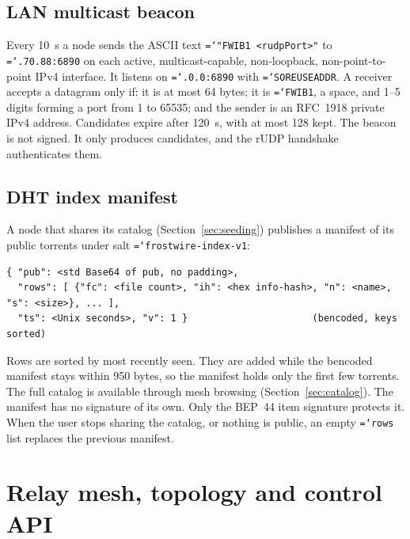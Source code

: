 \documentclass[11pt,a4paper]{article}
\newcommand{\code}[1]{\texttt{\hyphenchar\font=`\-\relax #1}}
\DeclareRobustCommand{\_}{\origunderscore\allowbreak}
\begin{document}
\subsection{LAN multicast beacon}
\label{sec:lan}
Every 10~s a node sends the ASCII text \code{"FWIB1 <rudpPort>"} to
\code{239.255.70.88:6890} on each active, multicast-capable, non-loopback,
non-point-to-point IPv4 interface. It listens on \code{0.0.0.0:6890} with
\code{SO\_REUSEADDR}. A receiver accepts a datagram only if: it is at most 64 bytes; it is
\code{FWIB1}, a space, and 1--5 digits forming a port from 1 to 65535; and the sender
is an RFC~1918 private IPv4 address. Candidates expire after 120~s, with at most 128 kept.
The beacon is not signed. It only produces candidates, and the rUDP handshake authenticates
them.

\subsection{DHT index manifest}
\label{sec:dht-index}
A node that shares its catalog (Section~\ref{sec:seeding}) publishes a manifest of its
public torrents under salt \code{frostwire-index-v1}:
\begin{lstlisting}
{ "pub": <std Base64 of pub, no padding>,
  "rows": [ {"fc": <file count>, "ih": <hex info-hash>, "n": <name>, "s": <size>}, ... ],
  "ts": <Unix seconds>, "v": 1 }                      (bencoded, keys sorted)
\end{lstlisting}
Rows are sorted by most recently seen. They are added while the bencoded manifest stays
within 950 bytes, so the manifest holds only the first few torrents. The full catalog is
available through mesh browsing (Section~\ref{sec:catalog}). The manifest has no signature
of its own. Only the BEP~44 item signature protects it. When the user stops sharing the
catalog, or nothing is public, an empty \code{rows} list replaces the previous manifest.

\section{Relay mesh, topology and control API}
\label{sec:mesh}
\end{document}
